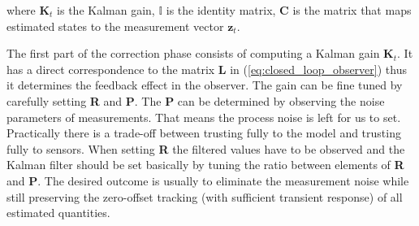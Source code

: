 where $\textbf{K}_t$ is the Kalman gain, $\mathbb{I}$ is the identity matrix, \textbf{C} is the matrix that maps estimated states to the measurement vector $\textbf{z}_t$.

The first part of the correction phase consists of computing a Kalman gain $\textbf{K}_t$. It has a direct correspondence to the matrix \textbf{L} in (\ref{eq:closed_loop_observer}) thus it determines the feedback effect in the observer. The gain can be fine tuned by carefully setting \textbf{R} and \textbf{P}. The \textbf{P} can be determined by observing the noise parameters of measurements. That means the process noise is left for us to set. Practically there is a trade-off between trusting fully to the model and trusting fully to sensors. When setting \textbf{R} the filtered values have to be observed and the Kalman filter should be set basically by tuning the ratio between elements of \textbf{R} and \textbf{P}. The desired outcome is usually to eliminate the measurement noise while still preserving the zero-offset tracking (with sufficient transient response) of all estimated quantities.


